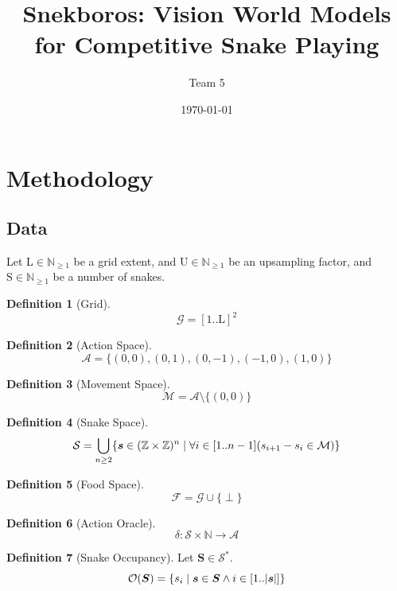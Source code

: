 \documentclass{amsart}
\title{Snekboros: Vision World Models for Competitive Snake Playing}
\author{Team 5}
\date{\today}
\theoremstyle{definition}
\newtheorem{definition}{Definition}
\theoremstyle{remark}
\newcommand{\N}{\mathbb{N}}
\newcommand{\Z}{\mathbb{Z}}
\newcommand{\setmid}{\;\middle|\;}
\begin{document}
\maketitle

\section{Methodology}

\subsection{Data}

Let $\mathrm{L}\in\N_{\geq 1}$ be a grid extent,
and $\mathrm{U}\in\N_{\geq 1}$ be an upsampling factor,
and $\mathrm{S}\in\N_{\geq 1}$ be a number of snakes.

\begin{definition}[Grid]
$$
	\mathcal{G}
	=
	[1..\mathrm{L}]^{2}
$$
\end{definition}

\begin{definition}[Action Space]
$$
	\mathcal{A}
	=
	\{(0,0),(0,1),(0,-1),(-1,0),(1,0)\}
$$
\end{definition}

\begin{definition}[Movement Space]
$$
	\mathcal{M}
	=
	\mathcal{A}\setminus\{(0,0)\}
$$
\end{definition}

\begin{definition}[Snake Space]
$$
	\mathcal{S}
	=
	\bigcup_{n\geq 2}\mleft\{
		\bm{s}\in(\Z\times\Z)^{n}
		\setmid
		\forall i\in[1..n-1]\mleft(
			s_{i+1}-s_{i}\in\mathcal{M}
		\mright)
	\mright\}
$$
\end{definition}

\begin{definition}[Food Space]
$$
	\mathcal{F}
	=
	\mathcal{G}\cup\{\perp\}
$$
\end{definition}

\begin{definition}[Action Oracle]
$$
	\delta:\mathcal{S}\times\N\to\mathcal{A}
$$
\end{definition}

\begin{definition}[Snake Occupancy]
Let $\bm{S}\in\mathcal{S}^{*}$.
$$
	\mathcal{O}(\bm{S})
	=
	\mleft\{
		s_{i}
		\mid
		\bm{s}\in\bm{S}
		\land
		i\in[1..\abs{\bm{s}}]
	\mright\}
$$
\end{definition}
\end{document}
